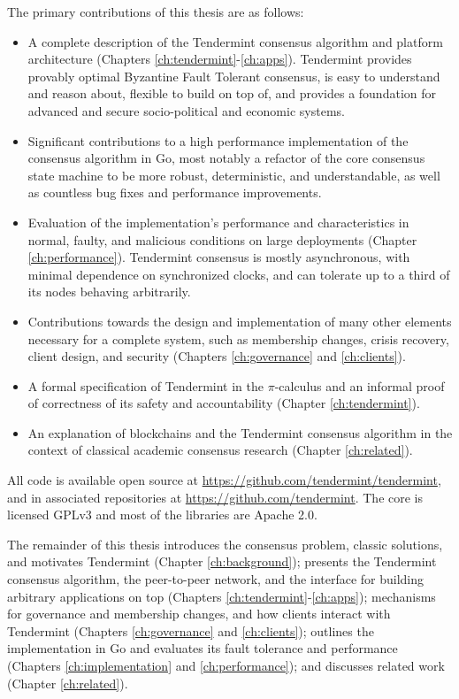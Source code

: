 The primary contributions of this thesis are as follows:


\begin{itemize}  

    \item A complete description of the Tendermint consensus algorithm and platform architecture (Chapters \ref{ch:tendermint}-\ref{ch:apps}). Tendermint provides provably optimal Byzantine Fault Tolerant consensus, is easy to understand and reason about, flexible to build on top of, and provides a foundation for advanced and secure socio-political and economic systems. 

    \item Significant contributions to a high performance implementation of the consensus algorithm in Go, most notably a refactor of the core consensus state machine to be more robust, deterministic, and understandable, as well as countless bug fixes and performance improvements.

    \item Evaluation of the implementation's performance and characteristics in normal, faulty, and malicious conditions on large deployments (Chapter \ref{ch:performance}). Tendermint consensus is mostly asynchronous, with minimal dependence on synchronized clocks, and can tolerate up to a third of its nodes behaving arbitrarily. 

    \item Contributions towards the design and implementation of many other elements necessary for a complete system, such as membership changes, crisis recovery, client design, and security (Chapters \ref{ch:governance} and \ref{ch:clients}).

    \item A formal specification of Tendermint in the $\pi$-calculus and 
an informal proof of correctness of its safety and accountability (Chapter \ref{ch:tendermint}).

    \item An explanation of blockchains and the Tendermint consensus algorithm in the context of classical academic consensus research (Chapter \ref{ch:related}).
\end{itemize}

All code is available open source at \url{https://github.com/tendermint/tendermint}, and in associated repositories at \url{https://github.com/tendermint}.
The core is licensed GPLv3 and most of the libraries are Apache 2.0.

The remainder of this thesis introduces the consensus problem, 
classic solutions, and motivates Tendermint (Chapter \ref{ch:background});
presents the Tendermint consensus algorithm, 
the peer-to-peer network, 
and the interface for building arbitrary applications on top 
(Chapters \ref{ch:tendermint}-\ref{ch:apps});
mechanisms for governance and membership changes, and how clients interact with Tendermint (Chapters \ref{ch:governance} and \ref{ch:clients});
outlines the implementation in Go and evaluates its fault tolerance and performance (Chapters \ref{ch:implementation} and \ref{ch:performance});
and discusses related work (Chapter \ref{ch:related}).
